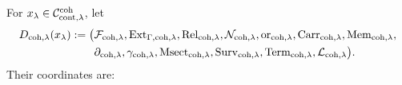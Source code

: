 For \(x_\lambda\in\mathcal C_{{\rm cont},\lambda}^{\rm coh}\), let
\begin{equation}\label{eq:pdfv2-coh-d-package}
 \begin{aligned}
 D_{{\rm coh},\lambda}(x_\lambda):=\bigl(&
 \mathcal F_{{\rm coh},\lambda},
 \operatorname{Ext}_{\Gamma,{\rm coh},\lambda},
 \operatorname{Rel}_{{\rm coh},\lambda},
 \mathcal N_{{\rm coh},\lambda},
 \operatorname{or}_{{\rm coh},\lambda},
 \operatorname{Carr}_{{\rm coh},\lambda},
 \operatorname{Mem}_{{\rm coh},\lambda},\\
 &\partial_{{\rm coh},\lambda},
 \gamma_{{\rm coh},\lambda},
 \operatorname{Msect}_{{\rm coh},\lambda},
 \operatorname{Surv}_{{\rm coh},\lambda},
 \operatorname{Term}_{{\rm coh},\lambda},
 \mathcal L_{{\rm coh},\lambda}\bigr).
 \end{aligned}
\end{equation}
Their coordinates are:
